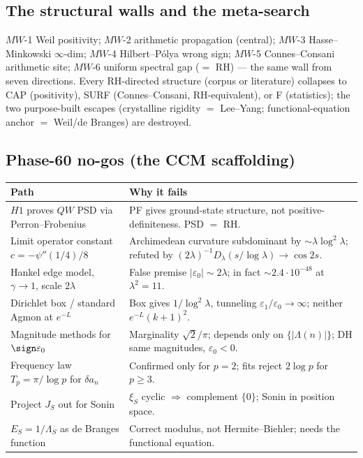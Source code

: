 \documentclass[11pt]{article}
\theoremstyle{remark}
\newcommand{\ve}{\varepsilon}
\begin{document}
\subsection{The structural walls and the meta-search}
$MW$-1 Weil positivity; $MW$-2 arithmetic propagation (central); $MW$-3 Hasse--Minkowski
$\infty$-dim; $MW$-4 Hilbert--P\'olya wrong sign; $MW$-5 Connes--Consani arithmetic site; $MW$-6
uniform spectral gap ($=$ RH) --- the same wall from seven directions. Every RH-directed
structure (corpus or literature) collapses to CAP (positivity), SURF (Connes--Consani,
RH-equivalent), or F (statistics); the two purpose-built escapes (crystalline rigidity $=$
Lee--Yang; functional-equation anchor $=$ Weil/de Branges) are destroyed.

\subsection{Phase-60 no-gos (the CCM scaffolding)}
\begin{longtable}{p{6.3cm} p{8cm}}
\toprule \textbf{Path} & \textbf{Why it fails} \\ \midrule \endhead
$H1$ proves $QW$ PSD via Perron--Frobenius & PF gives ground-state structure, not positive-definiteness. PSD $=$ RH. \\
Limit operator constant $c=-\psi''(1/4)/8$ & Archimedean curvature subdominant by $\sim\lambda\log^2\lambda$; refuted by $(2\lambda)^{-1}D_\lambda(s/\log\lambda)\to\cos2s$. \\
Hankel edge model, $\gamma\to1$, scale $2\lambda$ & False premise $|\ve_0|\sim2\lambda$; in fact $\sim2.4\cdot10^{-48}$ at $\lambda^2{=}11$. \\
Dirichlet box / standard Agmon at $e^{-L}$ & Box gives $1/\log^2\lambda$, tunneling $\ve_1/\ve_0\to\infty$; neither $e^{-L}(k{+}1)^2$. \\
Magnitude methods for $\sign\ve_0$ & Marginality $\sqrt2/\pi$; depends only on $\{|\Lambda(n)|\}$; DH same magnitudes, $\ve_0<0$. \\
Frequency law $T_p=\pi/\log p$ for $\delta a_n$ & Confirmed only for $p=2$; fits reject $2\log p$ for $p\ge3$. \\
Project $J_S$ out for Sonin & $\xi_S$ cyclic $\Rightarrow$ complement $\{0\}$; Sonin in position space. \\
$E_S=1/\Lambda_S$ as de Branges function & Correct modulus, not Hermite--Biehler; needs the functional equation. \\
\bottomrule
\end{longtable}
\end{document}
